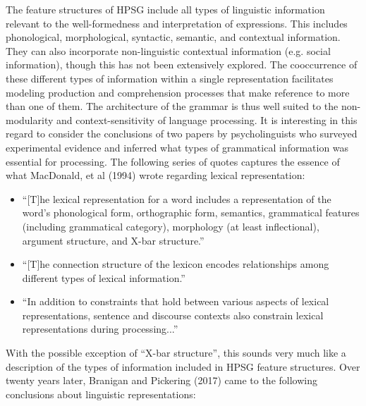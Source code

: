 \documentclass[a4paper]{article}
\begin{document}
The feature structures of HPSG include all
types of linguistic information relevant to the well-formedness and interpretation
of expressions. This includes phonological, morphological, syntactic, semantic, and contextual information.  They can also incorporate non-linguistic contextual information (e.g. social information), though this has not been extensively explored.
\newline
\newline
The cooccurrence of these different types of information within a single representation facilitates modeling production and comprehension processes that make reference to more than one of them.  The architecture of the grammar is thus well suited to the non-modularity and context-sensitivity of language processing.  
\newline
\newline
It is interesting in this regard to consider the conclusions of two papers by psycholinguists who surveyed experimental evidence and inferred what types of grammatical information was essential for processing.  
\newline
\newline
The following series of quotes captures the essence of what MacDonald, et al (1994) wrote regarding lexical representation:
\begin{itemize} 
\item ``[T]he lexical
representation for a word includes a representation of the
word's phonological form, orthographic form, semantics,
grammatical features (including grammatical category), morphology
(at least inflectional), argument structure, and X-bar
structure.''
\item ``[T]he connection
structure of the lexicon encodes relationships among
different types of lexical information.''
\item
``In addition to constraints that hold between various aspects
of lexical representations, sentence and discourse contexts also
constrain lexical representations during processing...''
\end{itemize}
With the possible exception of ``X-bar structure'', this sounds very much like a description of the types of information included in HPSG feature structures.
\newline
\newline
Over twenty years later, Branigan and Pickering (2017) came to the following conclusions about linguistic representations:
\end{document}
